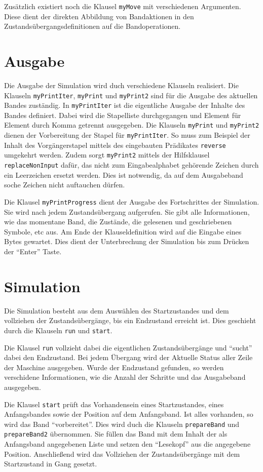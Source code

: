 \documentclass[final,a4paper,11pt,notitlepage,halfparskip]{scrreprt}
\begin{document}
Zusätzlich existiert noch die Klausel \texttt{myMove} mit verschiedenen
Argumenten. Diese dient der direkten Abbildung von Bandaktionen in den
Zustandsübergangsdefinitionen auf die Bandoperationen.

\section{Ausgabe}
Die Ausgabe der Simulation wird duch verschiedene Klauseln realisiert.
Die Klauseln \texttt{myPrintIter}, \texttt{myPrint} und
\texttt{myPrint2} sind für die Ausgabe des aktuellen Bandes zuständig.
In \texttt{myPrintIter} ist die eigentliche Ausgabe der Inhalte des
Bandes definiert. Dabei wird die Stapelliste durchgegangen und Element
für Element durch Komma getrennt ausgegeben. Die Klauseln
\texttt{myPrint} und \texttt{myPrint2} dienen der Vorbereitung der
Stapel für \texttt{myPrintIter}. So muss zum Beispiel der Inhalt des
Vorgängerstapel mittels des eingebauten Prädikates \texttt{reverse}
umgekehrt werden. Zudem sorgt \texttt{myPrint2} mittels der Hilfsklausel
\texttt{replaceNonInput} dafür, das nicht zum Eingabealphabet gehörende
Zeichen durch ein Leerzeichen ersetzt werden. Dies ist notwendig, da auf
dem Ausgabeband soche Zeichen nicht auftauchen dürfen.

Die Klausel \texttt{myPrintProgress} dient der Ausgabe des Fortschrittes
der Simulation. Sie wird nach jedem Zustandsübergang aufgerufen. Sie
gibt alle Informationen, wie das momentane Band, die Zustände, die
gelesenen und geschriebenen Symbole, etc aus. Am Ende der
Klauseldefinition wird auf die Eingabe eines Bytes gewartet. Dies dient
der Unterbrechung der Simulation bis zum Drücken der "`Enter"' Taste.

\section{Simulation}
Die Simulation besteht aus dem Auswählen des Startzustandes und dem
vollziehen der Zustandsübergänge, bis ein Endzustand erreicht ist. Dies
geschieht durch die Klauseln \texttt{run} und \texttt{start}. 

Die Klausel \texttt{run} vollzieht dabei die eigentlichen Zustandsübergänge
und "`sucht"' dabei den Endzustand. Bei jedem Übergang wird der Aktuelle
Status aller Zeile der Maschine ausgegeben. Wurde der Endzustand
gefunden, so werden verschidene Informationen, wie die Anzahl der
Schritte und das Ausgabeband ausgegeben.

Die Klausel \texttt{start} prüft das Vorhandensein eines Startzustandes,
eines Anfangsbandes sowie der Position auf dem Anfangsband. Ist alles
vorhanden, so wird das Band "`vorbereitet"'. Dies wird duch die Klauseln
\texttt{prepareBand} und \texttt{prepareBand2} übernommen. Sie füllen
das Band mit dem Inhalt der als Anfangsband angegebenen Liste und setzen
den "`Lesekopf"' aus die angegebene Position. Anschließend wird das
Vollziehen der Zustandsübergänge mit dem Startzustand in Gang gesetzt.
\end{document}
